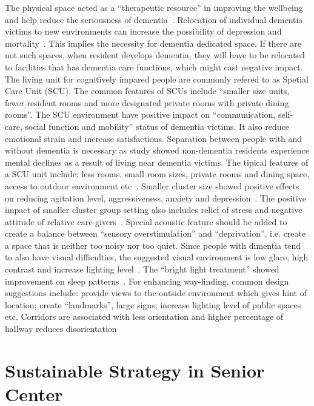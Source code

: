 The physical space acted as a ``therapeutic resource'' in improving
the wellbeing and help reduce the seriousness of
dementia~\cite{Day2000}. Relocation of individual dementia victims to
new environments can increase the possibility of depression and
mortality~\cite{ANTHONY01111987}. This implies the necessity for
dementia dedicated space. If there are not such spaces, when resident
develops dementia, they will have to be relocated to facilities that
has dementia care functions, which might cast negative impact. The
living unit for cognitively impared people are commonly refered to as
Spetial Care Unit (SCU). The common features of SCUs include ``smaller
size units, fewer resident rooms and more designated private rooms
with private dining rooms''. The SCU environment have positive impact
on ``communication, self-care, social function and mobility'' status
of dementia victims. It also reduce emotional strain and increase
satisfactions. Separation between people with and without dementia is
necessary as study showed non-dementia residents experience mental
declines as a result of living near dementia victims. The tipical
features of a SCU unit include: less rooms, small room sizes, private
rooms and dining space, access to outdoor environment
etc~\cite{Day2000}. Smaller cluster size showed positive effects on
reducing agitation level, aggressiveness, anxiety and
depression~\cite{Day2000}. The positive impact of smaller cluster
group setting also includes relief of stress and negative attitude of
relative care-givers~\cite{Annerstedt19931529, Day2000}. Special
acoustic feature should be added to create a balance between ``sensory
overstimulation'' and ``deprivation'', i.e. create a space that is
neither too noisy nor too quiet. Since people with dimentia tend to
also have visual difficulties, the suggested visual environment is low
glare, high contrast and increase lighting level~\cite{Day2000}. The
``bright light treatment'' showed improvement on sleep
patterns~\cite{Mishima1994}. For enhancing way-finding, common design
suggestions include: provide views to the outside environment which
gives hint of location; create ``landmarks'', large signs; increase
lighting level of public spaces etc. Corridors are associated with
less orientation and higher percentage of hallway reduces
disorientation~\cite{Day2000}
\section{Sustainable Strategy in Senior Center}